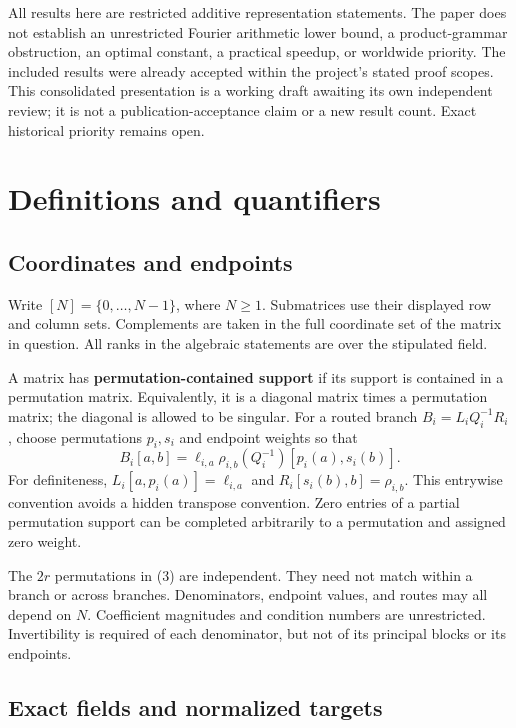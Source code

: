 \documentclass[
  11pt,
]{article}
\begin{document}
All results here are restricted additive representation statements. The
paper does not establish an unrestricted Fourier arithmetic lower bound,
a product-grammar obstruction, an optimal constant, a practical speedup,
or worldwide priority. The included results were already accepted within
the project's stated proof scopes. This consolidated presentation is a
working draft awaiting its own independent review; it is not a
publication-acceptance claim or a new result count. Exact historical
priority remains open.

\section{Definitions and quantifiers}\label{definitions-and-quantifiers}

\subsection{Coordinates and endpoints}\label{coordinates-and-endpoints}

Write \([N]=\{0,\ldots,N-1\}\), where \(N\ge1\). Submatrices use their
displayed row and column sets. Complements are taken in the full
coordinate set of the matrix in question. All ranks in the algebraic
statements are over the stipulated field.

A matrix has \textbf{permutation-contained support} if its support is
contained in a permutation matrix. Equivalently, it is a diagonal matrix
times a permutation matrix; the diagonal is allowed to be singular. For
a routed branch \(B_i=L_iQ_i^{-1}R_i\), choose permutations \(p_i,s_i\)
and endpoint weights so that \[
 B_i[a,b]=\ell_{i,a}\rho_{i,b}(Q_i^{-1})[p_i(a),s_i(b)].       \tag{3}
\] For definiteness, \(L_i[a,p_i(a)]=\ell_{i,a}\) and
\(R_i[s_i(b),b]=\rho_{i,b}\). This entrywise convention avoids a hidden
transpose convention. Zero entries of a partial permutation support can
be completed arbitrarily to a permutation and assigned zero weight.

The \(2r\) permutations in (3) are independent. They need not match
within a branch or across branches. Denominators, endpoint values, and
routes may all depend on \(N\). Coefficient magnitudes and condition
numbers are unrestricted. Invertibility is required of each denominator,
but not of its principal blocks or its endpoints.

\subsection{Exact fields and normalized
targets}\label{exact-fields-and-normalized-targets}
\end{document}
